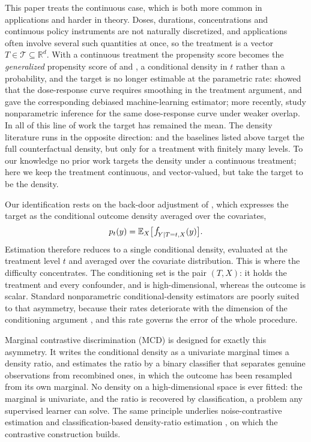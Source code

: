 \documentclass[11pt]{article}
\theoremstyle{plain}
\theoremstyle{definition}
\theoremstyle{remark}
\newcommand{\pE}{\ensuremath{\mathbb{E}}}
\newcommand{\R}{\mathbb{R}}
\newcommand{\cT}{\ensuremath{\mathcal{T}}}
\newcommand{\pf}[1]{\ensuremath{\,\mathlarger{\textit{f}}_{#1}}}
\begin{document}
This paper treats the continuous case, which is both more common in applications and harder
in theory. Doses, durations, concentrations and continuous policy instruments are not
naturally discretized, and applications often involve several such quantities at once, so
the treatment is a vector $T \in \cT \subseteq \R^d$. With a continuous treatment the
propensity score becomes the \emph{generalized} propensity score of \citet{imbens2000} and
\citet{hirano2004}, a conditional density in $t$ rather than a probability, and the target
is no longer estimable at the parametric rate: \citet{kennedy2017continuous} showed that the
dose-response curve requires smoothing in the treatment argument, and \citet{colangelo2020}
gave the corresponding debiased machine-learning estimator; more recently,
\citet{hudson2023dose} study nonparametric inference for the same dose-response curve under
weaker overlap. In all of this line of work the target has remained the mean. The density
literature runs in the opposite direction: \citet{kennedy2023density} and the baselines listed
above target the full counterfactual density, but only for a treatment with finitely many
levels. To our knowledge no prior work targets the density under a continuous treatment; here
we keep the treatment continuous, and vector-valued, but take the target to be the density.

Our identification rests on the back-door adjustment of \citet{pearl1995,pearl2009}, which
expresses the target as the conditional outcome density averaged over the covariates,
\[
p_t(y) = \pE_X\big[\pf{Y \mid T=t,X}(y)\big].
\]
Estimation therefore reduces to a single conditional density, evaluated at the treatment
level $t$ and averaged over the covariate distribution. This is where the difficulty
concentrates. The conditioning set is the pair $(T,X)$: it holds the treatment and every
confounder, and is high-dimensional, whereas the outcome is scalar. Standard nonparametric
conditional-density estimators are poorly suited to that asymmetry, because their rates
deteriorate with the dimension of the conditioning argument
\citep{stone1980,Tsybakov2009NonparametricEstimation}, and this rate governs the error of
the whole procedure.

Marginal contrastive discrimination (MCD) \citep{meziani2025mcd} is designed for exactly this
asymmetry. It writes the conditional density as a univariate marginal times a density ratio,
and estimates the ratio by a binary classifier that separates genuine observations from
recombined ones, in which the outcome has been resampled from its own marginal. No density on a high-dimensional
space is ever fitted: the marginal is univariate, and the ratio is recovered by
classification, a problem any supervised learner can solve. The same principle underlies
noise-contrastive estimation \citep{gutmann2010nce} and classification-based density-ratio
estimation \citep{sugiyama2012density}, on which the contrastive construction builds.
\end{document}
